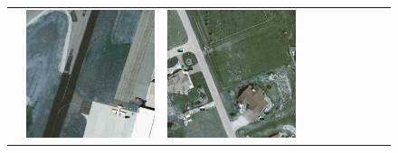\begin{figure}[H]
\begin{tabularx}{\textwidth}{c|*{9}{X}}
    &  \includegraphics[trim={650pt 120pt 170pt 720pt},clip,width=\linewidth]{images/015Results/02perm_exp/comp_images/rgb/487.png}
    & \includegraphics[trim={230pt 200pt 680pt 725pt},clip,width=\linewidth]{images/015Results/02perm_exp/comp_images/rgb/509.png}

\end{tabularx}
\end{figure}

